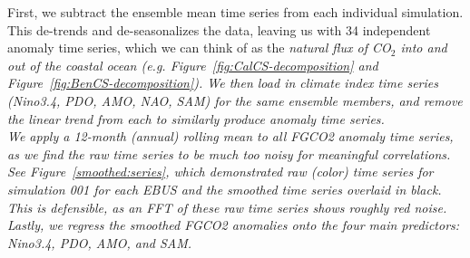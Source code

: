 \documentclass[12pt]{article}
\begin{document}
First, we subtract the ensemble mean time series from each individual simulation. This de-trends and de-seasonalizes the data, leaving us with 34 independent anomaly time series, which we can think of as the \it natural \rm flux of CO$_{2}$ into and out of the coastal ocean (e.g. Figure~\ref{fig:CalCS-decomposition} and Figure~\ref{fig:BenCS-decomposition}). We then load in climate index time series (Nino3.4, PDO, AMO, NAO, SAM) for the same ensemble members, and remove the linear trend from each to similarly produce anomaly time series. \\


We apply a 12-month (annual) rolling mean to all FGCO2 anomaly time series, as we find the raw time series to be much too noisy for meaningful correlations. See Figure~\ref{smoothed:series}, which demonstrated raw (color) time series for simulation 001 for each EBUS and the smoothed time series overlaid in black. This is defensible, as an FFT of these raw time series shows roughly red noise. \\

Lastly, we regress the smoothed FGCO2 anomalies onto the four main predictors: Nino3.4, PDO, AMO, and SAM. 
\end{document}
